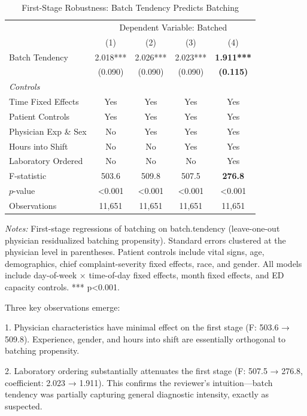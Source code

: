 \documentclass[11pt]{article}
\newcommand{\1}{\hbox{\rm 1\kern-.35em 1}}
\begin{document}
\begin{table}[ht]
\centering
\caption*{First-Stage Robustness: Batch Tendency Predicts Batching}
\label{tab:first_stage_robustness}
\begin{threeparttable}
\begin{tabular}{lcccc}
\toprule 
& \multicolumn{4}{c}{Dependent Variable: Batched}\\
\cmidrule(lr){2-5}
& (1) & (2) & (3) & (4) \\
\midrule
Batch Tendency & 2.018*** & 2.026*** & 2.023*** & \textbf{1.911***} \\ 
& (0.090) & (0.090) & (0.090) & \textbf{(0.115)} \\
\midrule
\textit{Controls} \\
Time Fixed Effects & Yes & Yes & Yes & Yes \\
Patient Controls & Yes & Yes & Yes & Yes \\
Physician Exp \& Sex & No & Yes & Yes & Yes \\
Hours into Shift & No & No & Yes & Yes \\
Laboratory Ordered & No & No & No & Yes \\
\midrule
F-statistic & 503.6 & 509.8 & 507.5 & \textbf{276.8} \\
$p$-value & <0.001 & <0.001 & <0.001 & <0.001 \\
Observations & 11,651 & 11,651 & 11,651 & 11,651 \\
\bottomrule
\end{tabular}
\begin{tablenotes}
\footnotesize
\item \textit{Notes:} First-stage regressions of batching on batch.tendency (leave-one-out physician residualized batching propensity). Standard errors clustered at the physician level in parentheses. Patient controls include vital signs, age, demographics, chief complaint-severity fixed effects, race, and gender. All models include day-of-week × time-of-day fixed effects, month fixed effects, and ED capacity controls. *** p<0.001.
\end{tablenotes}
\end{threeparttable}
\end{table}

Three key observations emerge:

1. Physician characteristics have minimal effect on the first stage (F: 503.6 → 509.8). Experience, gender, and hours into shift are essentially orthogonal to batching propensity.

2. Laboratory ordering substantially attenuates the first stage (F: 507.5 → 276.8, coefficient: 2.023 → 1.911). This confirms the reviewer's intuition—batch tendency was partially capturing general diagnostic intensity, exactly as suspected.
\end{document}
